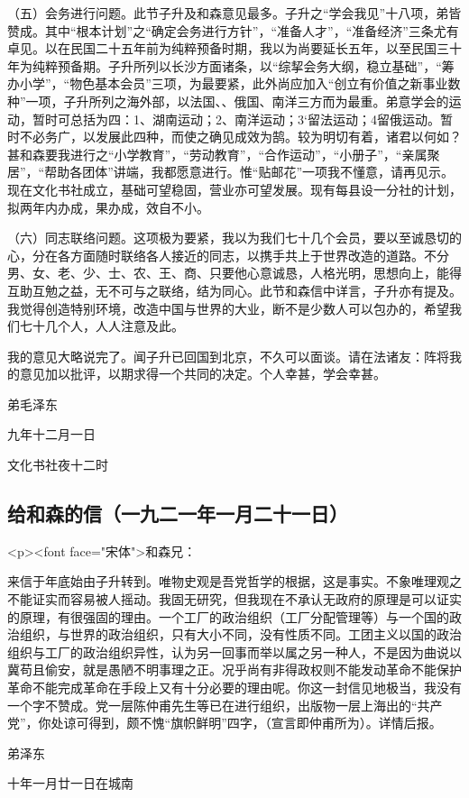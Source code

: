 （五）会务进行问题。此节子升及和森意见最多。子升之“学会我见”十八项，弟皆赞成。其中“根本计划”之“确定会务进行方针”，“准备人才”，“准备经济”三条尤有卓见。以在民国二十五年前为纯粹预备时期，我以为尚要延长五年，以至民国三十年为纯粹预备期。子升所列以长沙方面诸条，以“综挈会务大纲，稳立基础”，“筹办小学”，“物色基本会员”三项，为最要紧，此外尚应加入“创立有价值之新事业数种”一项，子升所列之海外部，以法国、、俄国、南洋三方而为最重。弟意学会的运动，暂时可总括为四：1、湖南运动；2、南洋运动；3`留法运动；4留俄运动。暂时不必务广，以发展此四种，而使之确见成效为鹄。较为明切有着，诸君以何如？甚和森要我进行之“小学教育”，“劳动教育”，“合作运动”，“小册子”，“亲属聚居”，“帮助各团体”讲端，我都愿意进行。惟“贴邮花”一项我不懂意，请再见示。现在文化书社成立，基础可望稳固，营业亦可望发展。现有每县设一分社的计划，拟两年内办成，果办成，效自不小。

（六）同志联络问题。这项极为要紧，我以为我们七十几个会员，要以至诚恳切的心，分在各方面随时联络各人接近的同志，以携手共上于世界改造的道路。不分男、女、老、少、士、农、王、商、只要他心意诚恳，人格光明，思想向上，能得互助互勉之益，无不可与之联络，结为同心。此节和森信中详言，子升亦有提及。我觉得创造特别环境，改造中国与世界的大业，断不是少数人可以包办的，希望我们七十几个人，人人注意及此。

我的意见大略说完了。闻子升已回国到北京，不久可以面谈。请在法诸友：阵将我的意见加以批评，以期求得一个共同的决定。个人幸甚，学会幸甚。

\begin{flushright}
弟毛泽东

九年十二月一日
    
文化书社夜十二时\end{flushright}
\subsection{给和森的信（一九二一年一月二十一日）}
<p><font face="宋体">和森兄：

来信于年底始由子升转到。唯物史观是吾党哲学的根据，这是事实。不象唯理观之不能证实而容易被人摇动。我固无研究，但我现在不承认无政府的原理是可以证实的原理，有很强固的理由。一个工厂的政治组织（工厂分配管理等）与一个国的政治组织，与世界的政治组织，只有大小不同，没有性质不同。工团主义以国的政治组织与工厂的政治组织异性，认为另一回事而举以属之另一种人，不是因为曲说以冀苟且偷安，就是愚陋不明事理之正。况乎尚有非得政权则不能发动革命不能保护革命不能完成革命在手段上又有十分必要的理由呢。你这一封信见地极当，我没有一个字不赞成。党一层陈仲甫先生等已在进行组织，出版物一层上海出的“共产党”，你处谅可得到，颇不愧“旗帜鲜明”四字，（宣言即仲甫所为）。详情后报。

 弟泽东

 十年一月廿一日在城南
